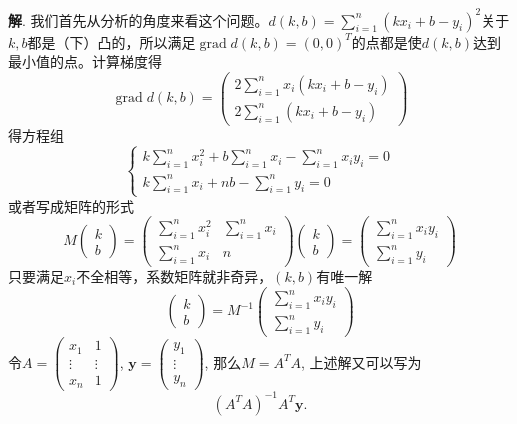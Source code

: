 {\bf 解}. 我们首先从分析的角度来看这个问题。$d(k, b) = \sum\limits_{i=1}^n (kx_i + b - y_i)^2$关于$k, b$都是（下）凸的，所以满足$\operatorname{grad} d(k, b) = (0,0)^T$的点都是使$d(k, b)$达到最小值的点。计算梯度得
$$
\operatorname{grad} d(k, b) = \begin{pmatrix} 2 \sum\limits_{i=1}^n x_i (kx_i + b - y_i) \\ 2 \sum\limits_{i=1}^n (kx_i + b - y_i) \end{pmatrix}
$$
得方程组
$$
\begin{cases}
k \sum\limits_{i=1}^n x_i^2 + b \sum\limits_{i=1}^n x_i - \sum\limits_{i=1}^n x_i y_i = 0 \\
k \sum\limits_{i=1}^n x_i + nb - \sum\limits_{i=1}^n y_i = 0
\end{cases}
$$
或者写成矩阵的形式
$$
M \begin{pmatrix} k \\ b \end{pmatrix} = \begin{pmatrix} \sum\limits_{i=1}^n x_i^2 & \sum\limits_{i=1}^n x_i \\ \sum\limits_{i=1}^n x_i & n \end{pmatrix} \begin{pmatrix} k \\ b \end{pmatrix} = \begin{pmatrix} \sum\limits_{i=1}^n x_i y_i \\ \sum\limits_{i=1}^n y_i \end{pmatrix}
$$
只要满足$x_i$不全相等，系数矩阵就非奇异，$(k, b)$有唯一解
$$\begin{pmatrix} k \\ b \end{pmatrix} = M^{-1}\begin{pmatrix} \sum\limits_{i=1}^n x_i y_i \\ \sum\limits_{i=1}^n y_i \end{pmatrix}$$
令$A = \begin{pmatrix} x_1 & 1 \\ \vdots & \vdots \\ x_n & 1 \end{pmatrix}$, $\mathbf{y} = \begin{pmatrix} y_1 \\ \vdots \\ y_n \end{pmatrix}$, 那么$M = A^TA$, 上述解又可以写为
$$(A^TA)^{-1}A^T\mathbf{y}.$$

